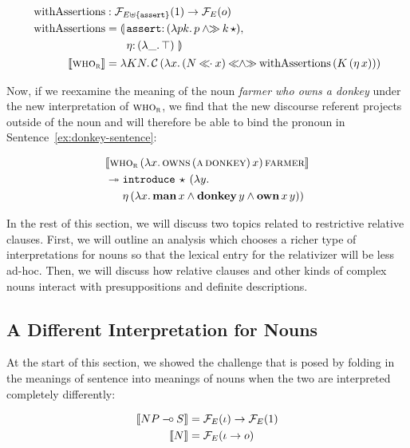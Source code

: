 \begin{align*}
  \withAssertions &: \FF_{E \uplus \{\op{assert}\}}(1) \to \FF_E(o) \\
  \withAssertions &= \lban \begin{aligned}[t]
      &\onto{\op{assert}}{(\lam{p k}{p \andr \ap{k}{\star}})}, \\
      &\onto{\eta}{(\lam{\_}{\top})} \, \rban
    \end{aligned} \\
  \sem{\abs{who}_{\abs{r}}} &= \lam{K N}{\ap{\CC}{(\lam{x}{(N \apl x) \andlr \ap{\withAssertions}{(\ap{K}{(\etaE{x})})}})}}
\end{align*}

Now, if we reexamine the meaning of the noun \emph{farmer who owns a
  donkey} under the new interpretation of $\textsc{who}_{\textsc{r}}$, we find
that the new discourse referent projects outside of the noun and will
therefore be able to bind the pronoun in Sentence~\ref{ex:donkey-sentence}:

\begin{align*}
& \llbracket \textsc{who}_{\textsc{r}}\,(\lambda x.\, \textsc{owns}\,(\textsc{a}\,\textsc{donkey})\,x)\,\textsc{farmer} \rrbracket \\
& \twoheadrightarrow \begin{aligned}[t]
    &\mathtt{introduce}\,\star\,(\lambda y.\,  \\
    &\eta\,(\lambda x.\, \textbf{man}\,x \land \textbf{donkey}\,y \land \textbf{own}\,x\,y))\end{aligned}
\end{align*}

In the rest of this section, we will discuss two topics related to
restrictive relative clauses. First, we will outline an analysis which
chooses a richer type of interpretations for nouns so that the lexical
entry for the relativizer will be less ad-hoc. Then, we will discuss how
relative clauses and other kinds of complex nouns interact with
presuppositions and definite descriptions.


\subsection{A Different Interpretation for Nouns}
\label{ssec:different-nouns}

At the start of this section, we showed the challenge that is posed by
folding in the meanings of sentence into meanings of nouns when the two are
interpreted completely differently:

\begin{align*}
  \llbracket NP \mathbin{{-}\mkern-3.5mu{\circ}} S \rrbracket &= \mathcal{F}_E(\iota) \to \mathcal{F}_E(1) \\
  \llbracket N \rrbracket &= \mathcal{F}_E(\iota \to o)
\end{align*}

